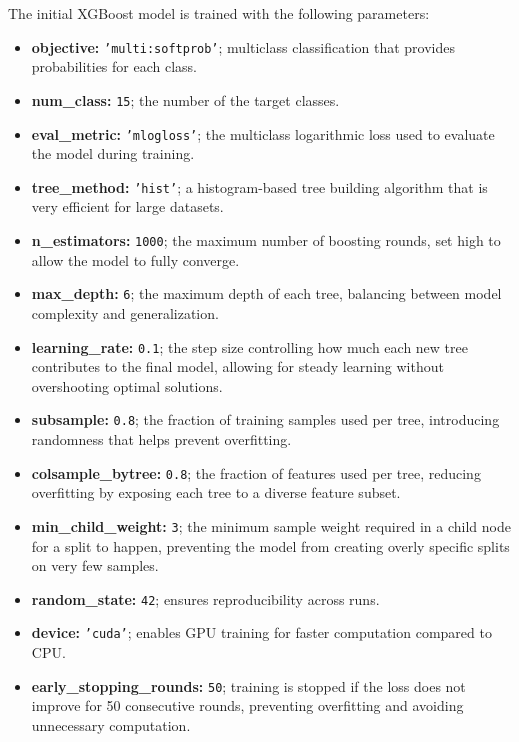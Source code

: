 The initial XGBoost model is trained with the following parameters:

\begin{itemize}
    \item \textbf{objective:} \texttt{'multi:softprob'}; multiclass classification that provides probabilities for each class.
    \item \textbf{num\_class:} \texttt{15}; the number of the target classes.
          \vspace{0.5cm}
    \item \textbf{eval\_metric:} \texttt{'mlogloss'}; the multiclass logarithmic loss used to evaluate the model during training.
    \item \textbf{tree\_method:} \texttt{'hist'}; a histogram-based tree building algorithm that is very efficient for large datasets.
    \item \textbf{n\_estimators:} \texttt{1000}; the maximum number of boosting rounds, set high to allow the model to fully converge.
    \item \textbf{max\_depth:} \texttt{6}; the maximum depth of each tree, balancing between model complexity and generalization.
    \item \textbf{learning\_rate:} \texttt{0.1}; the step size controlling how much each new tree contributes to the final model, allowing for steady learning without overshooting optimal solutions.
    \item \textbf{subsample:} \texttt{0.8}; the fraction of training samples used per tree, introducing randomness that helps prevent overfitting.
    \item \textbf{colsample\_bytree:} \texttt{0.8}; the fraction of features used per tree, reducing overfitting by exposing each tree to a diverse feature subset.
    \item \textbf{min\_child\_weight:} \texttt{3}; the minimum sample weight required in a child node for a split to happen, preventing the model from creating overly specific splits on very few samples.
    \item \textbf{random\_state:} \texttt{42}; ensures reproducibility across runs.
    \item \textbf{device:} \texttt{'cuda'}; enables GPU training for faster computation compared to CPU.
    \item \textbf{early\_stopping\_rounds:} \texttt{50}; training is stopped if the loss does not improve for 50 consecutive rounds, preventing overfitting and avoiding unnecessary computation.
\end{itemize}

